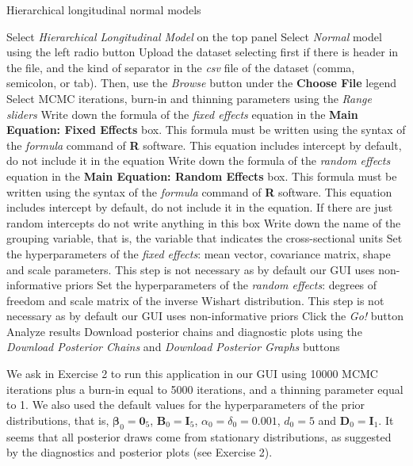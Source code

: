 \begin{algorithm}[h!]
	\caption{Hierarchical longitudinal normal models}\label{alg:HLN}
	\begin{algorithmic}[1]  		 			
		\State Select \textit{Hierarchical Longitudinal Model} on the top panel
		\State Select \textit{Normal} model using the left radio button
		\State Upload the dataset selecting first if there is header in the file, and the kind of separator in the \textit{csv} file of the dataset (comma, semicolon, or tab). Then, use the \textit{Browse} button under the \textbf{Choose File} legend
		\State Select MCMC iterations, burn-in and thinning parameters using the \textit{Range sliders}
		\State Write down the formula of the \textit{fixed effects} equation in the \textbf{Main Equation: Fixed Effects} box. This formula must be written using the syntax of the \textit{formula} command of \textbf{R} software. This equation includes intercept by default, do not include it in the equation
		\State Write down the formula of the \textit{random effects} equation in the \textbf{Main Equation: Random Effects} box. This formula must be written using the syntax of the \textit{formula} command of \textbf{R} software. This equation includes intercept by default, do not include it in the equation. If there are just random intercepts do not write anything in this box
		\State Write down the name of the grouping variable, that is, the variable that indicates the cross-sectional units 
		\State Set the hyperparameters of the \textit{fixed effects}: mean vector, covariance matrix, shape and scale parameters. This step is not necessary as by default our GUI uses non-informative priors
		\State Set the hyperparameters of the \textit{random effects}: degrees of freedom and scale matrix of the inverse Wishart distribution. This step is not necessary as by default our GUI uses non-informative priors
		\State Click the \textit{Go!} button
		\State Analyze results
		\State Download posterior chains and diagnostic plots using the \textit{Download Posterior Chains} and \textit{Download Posterior Graphs} buttons
	\end{algorithmic} 
\end{algorithm}

We ask in Exercise 2 to run this application in our GUI using 10000 MCMC iterations plus a burn-in equal to 5000 iterations, and a thinning parameter equal to 1. We also used the default values for the hyperparameters of the prior distributions, that is, $\bm{\beta}_0=\bm{0}_5$, $\bm{B}_0=\bm{I}_5$, $\alpha_0=\delta_0=0.001$, $d_0=5$ and $\bm{D}_0=\bm{I}_1$. It seems that all posterior draws come from stationary distributions, as suggested by the diagnostics and posterior plots (see Exercise 2).

